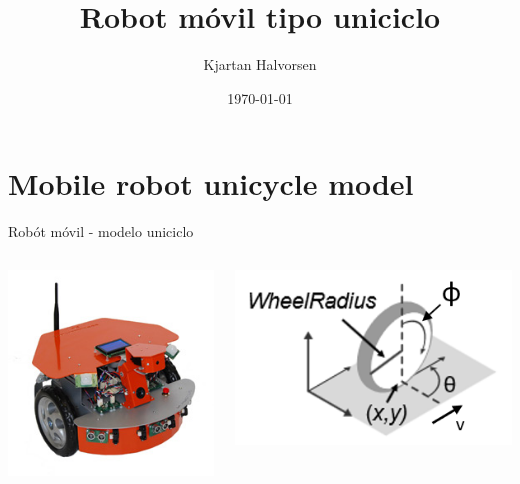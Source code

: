 \documentclass[presentation,aspectratio=169]{beamer}
\author{Kjartan Halvorsen}
\date{\today}
\title{Robot móvil tipo uniciclo}
\begin{document}
\maketitle

\section{Mobile robot unicycle model}
\label{sec:org753b547}

\begin{frame}[label={sec:org45ff32d}]{Robót móvil - modelo uniciclo}
\begin{columns}
\begin{column}{0.4\columnwidth}
\begin{center}
 \includegraphics[width=.3\linewidth]{../figures/X80Pro.jpg}
\end{center}
\end{column}




\begin{column}{0.4\columnwidth}
\begin{center}
 \includegraphics[width=1.0\linewidth]{../figures/unicycle_annotated.png}
\end{center}
\end{column}
\end{columns}
\end{frame}
\end{document}
